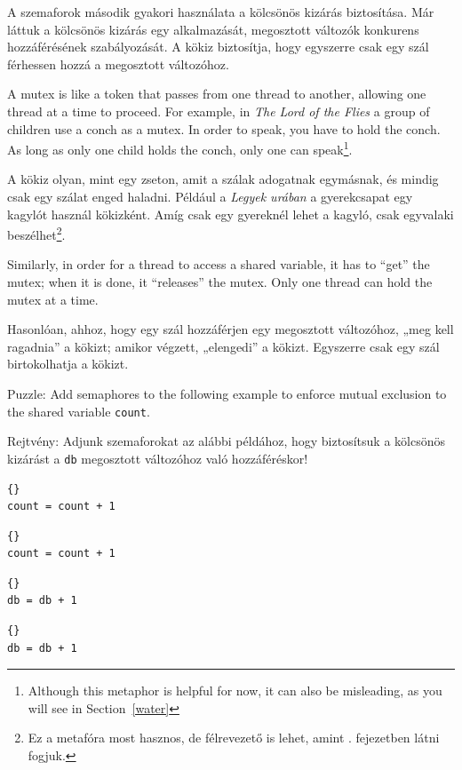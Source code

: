 \documentclass{book}
\begin{document}
A szemaforok második gyakori használata a kölcsönös kizárás
biztosítása. Már láttuk a kölcsönös kizárás egy alkalmazását,
megosztott változók konkurens hozzáférésének szabályozását.
A kökiz biztosítja, hogy egyszerre csak egy szál férhessen
hozzá a megosztott változóhoz.

A mutex is like a token that passes from one thread to another,
allowing one thread at a time to proceed.  For example, in {\em The
Lord of the Flies} a group of children use a conch as a mutex.  In
order to speak, you have to hold the conch.  As long as only one child
holds the conch, only one can speak\footnote{Although this metaphor
is helpful for now, it can also be misleading, as you will see in
Section~\ref{water}}.

A kökiz olyan, mint egy zseton, amit a szálak adogatnak egymásnak,
és mindig csak egy szálat enged haladni. Például a {\em Legyek urában}
a gyerekcsapat egy kagylót használ kökizként. Amíg csak egy gyereknél
lehet a kagyló, csak egyvalaki beszélhet\footnote{
Ez a metafóra most hasznos, de félrevezető is lehet, amint .
fejezetben látni fogjuk.}.

Similarly, in order for a thread to access a shared variable,
it has to ``get'' the mutex; when it is done, it ``releases''
the mutex.  Only one thread can hold the mutex at a time.

Hasonlóan, ahhoz, hogy egy szál hozzáférjen egy megosztott
változóhoz, „meg kell ragadnia” a kökizt; amikor végzett,
„elengedi” a kökizt. Egyszerre csak egy szál birtokolhatja
a kökizt.

Puzzle: Add semaphores to the following example to
enforce mutual exclusion to the shared variable {\tt count}.

Rejtvény: Adjunk szemaforokat az alábbi példához, hogy
biztosítsuk a kölcsönös kizárást a {\tt db} megosztott
változóhoz való hozzáféréskor!

\begin{minipage}[t]{2in}
\begin{lstlisting}[title={Thread A}]{}
count = count + 1
\end{lstlisting}
\end{minipage}
\hfill
\begin{minipage}[t]{2in}
\begin{lstlisting}[title={Thread B}]{}
count = count + 1
\end{lstlisting}
\end{minipage}

\begin{minipage}[t]{2in}
\begin{lstlisting}[title={„A” szál}]{}
db = db + 1
\end{lstlisting}
\end{minipage}
\hfill
\begin{minipage}[t]{2in}
\begin{lstlisting}[title={„B” szál}]{}
db = db + 1
\end{lstlisting}
\end{minipage}
\end{document}
